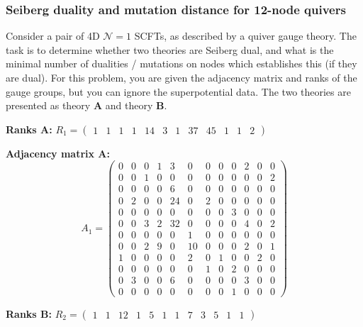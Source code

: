 \subsubsection{Seiberg duality and mutation distance for 12-node quivers}
\label{problem:seiberg-duality-12-node}
Consider a pair of 4D $\mathcal{N} = 1$ SCFTs, as described by a quiver gauge theory. The task is to determine whether two theories are Seiberg dual, and what is the minimal number of dualities / mutations on nodes which establishes this (if they are dual). For this problem, you are given the adjacency matrix and ranks of the gauge groups, but you can ignore the superpotential data. The two theories are presented as theory \textbf{A} and theory \textbf{B}.

\textbf{Ranks A:}
$R_1 = \begin{pmatrix} 
1 & 1 & 1 & 1 & 14 & 3 & 1 & 37 & 45 & 1 & 1 & 2 
\end{pmatrix}$

\textbf{Adjacency matrix A:}
\[
A_1 =  \begin{pmatrix}
0 & 0 & 0 & 1 & 3 & 0 & 0 & 0 & 0 & 2 & 0 & 0 \\
0 & 0 & 1 & 0 & 0 & 0 & 0 & 0 & 0 & 0 & 0 & 2 \\
0 & 0 & 0 & 0 & 6 & 0 & 0 & 0 & 0 & 0 & 0 & 0 \\
0 & 2 & 0 & 0 & 24 & 0 & 2 & 0 & 0 & 0 & 0 & 0 \\
0 & 0 & 0 & 0 & 0 & 0 & 0 & 0 & 3 & 0 & 0 & 0 \\
0 & 0 & 3 & 2 & 32 & 0 & 0 & 0 & 0 & 4 & 0 & 2 \\
0 & 0 & 0 & 0 & 0 & 1 & 0 & 0 & 0 & 0 & 0 & 0 \\
0 & 0 & 2 & 9 & 0 & 10 & 0 & 0 & 0 & 2 & 0 & 1 \\
1 & 0 & 0 & 0 & 0 & 2 & 0 & 1 & 0 & 0 & 2 & 0 \\
0 & 0 & 0 & 0 & 0 & 0 & 1 & 0 & 2 & 0 & 0 & 0 \\
0 & 3 & 0 & 0 & 6 & 0 & 0 & 0 & 0 & 3 & 0 & 0 \\
0 & 0 & 0 & 0 & 0 & 0 & 0 & 0 & 1 & 0 & 0 & 0
\end{pmatrix}
\]



\textbf{Ranks B:} $R_2 = \begin{pmatrix}
1 & 1 & 12 & 1 & 5 & 1 & 1 & 7 & 3 & 5 & 1 & 1
\end{pmatrix}$

